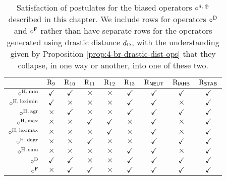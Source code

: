 \begin{table}\centering
	\begin{tabular}{rcccccccc}\toprule
		&
		$\mathrm{R}_{9}$					&
		$\mathrm{R}_{10}$					&
		$\mathrm{R}_{11}$					&
		$\mathrm{R}_{12}$					&
		$\mathrm{R}_{13}$					&
		$\mathrm{R}_{\mathsf{NEUT}}$					&
		$\mathrm{R}_{\mathsf{IAHB}}$					&
		$\mathrm{R}_{\mathsf{STAB}}					$
									\\\midrule
		
		$\circ^{{\operatorname{H}},\:{\operatorname{min}}}$ 	& 
		$\checkmark$				&
		$\checkmark$				&
		$\times$					&
		$\times$					&
		$\checkmark$				&
		$\checkmark$				&
		$\checkmark$				&
		$\checkmark$				\\
		
		$\circ^{{\operatorname{H}},\:{\operatorname{leximin}}}$	&
		$\checkmark$				&
		$\times$					&
		$\times$					&
		$\times$					&
		$\checkmark$				&
		$\checkmark$				&
		$\times$					&
		$\checkmark$				\\
		
		$\circ^{{\operatorname{H}},\:\mathrm{agr}}$		&
		$\times$					&
		$\checkmark$				&
		$\times$					&
		$\times$					&
		$\checkmark$				&
		$\checkmark$				&
		$\checkmark$				&	
		$\checkmark$				\\
		
		$\circ^{{\operatorname{H}},\:{\operatorname{max}}}$	&
		$\times$					&
		$\times$					&
		$\checkmark$				&
		$\checkmark$				&
		$\times$					&
		$\checkmark$				&
		$\times$					&
		$\checkmark$				\\
		
		$\circ^{{\operatorname{H}},\:{\operatorname{leximax}}}$	&
		$\times$					&
		$\times$					&
		$\times$					&
		$\checkmark$				&
		$\times$					&
		$\checkmark$				&
		$\times$					&
		$\checkmark$				\\
		
		$\circ^{{\operatorname{H}},\:\mathrm{dagr}}$	&
		$\times$					&
		$\times$					&
		$\checkmark$				&
		$\times$					&
		$\times$					&
		$\checkmark$				&
		$\checkmark$				&
		$\checkmark$				\\
		
		$\circ^{{\operatorname{H}},\:{\operatorname{sum}}}$	&
		$\times$					&
		$\times$					&
		$\times$					&
		$\times$					&
		$\checkmark$				&
		$\checkmark$				&
		$\times$					&
		$\checkmark$				\\
		
		$\circ^{\operatorname{D}}$				&
		$\checkmark$				&
		$\checkmark$				&
		$\times$					&
		$\times$					&
		$\checkmark$				&
		$\checkmark$				&
		$\checkmark$				&
		$\checkmark$				\\
		
		$\circ^{\mathrm{F}}$			&
		$\times$					&
		$\checkmark$				&
		$\checkmark$				&
		$\times$					&
		$\checkmark$				&
		$\checkmark$				&
		$\checkmark$				&
		$\checkmark$				\\\bottomrule
	\end{tabular}
\caption{
	Satisfaction of postulates for the biased operators $\circ^{d,\:{\operatorname{\oplus}}}$
	described in this chapter.
	We include rows for operators $\circ^{\operatorname{D}}$ and $\circ^{\mathrm{F}}$ rather than 
	have separate rows for the operators generated using drastic distance $d_{\operatorname{D}}$,
	with the understanding given by Proposition \ref{prop:4-br-drastic-dist-ops}
	that they collapse, in one way or another, into one of these two.
	}
\label{tab:4-br-biased-ops-postulates}
\end{table}

